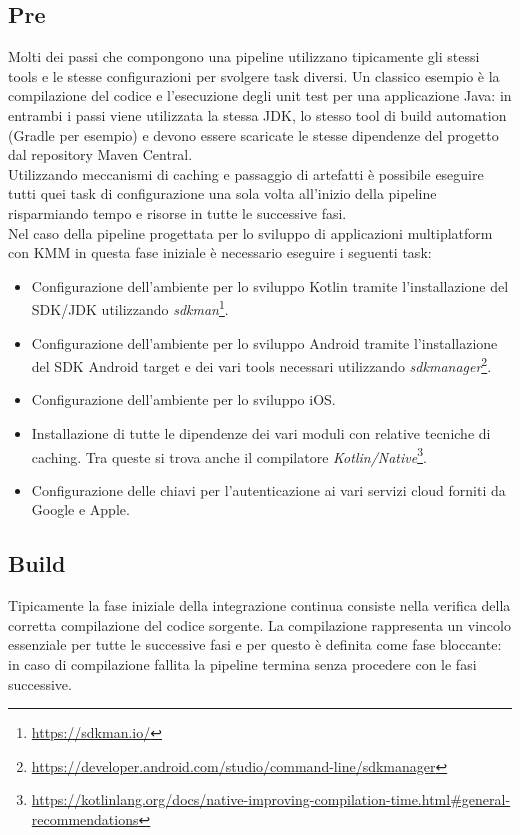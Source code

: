 \subsection{Pre}
Molti dei passi che compongono una pipeline utilizzano tipicamente gli stessi tools e le stesse configurazioni per svolgere task diversi. Un classico esempio è la compilazione del codice e l'esecuzione degli unit test per una applicazione Java: in entrambi i passi viene utilizzata la stessa JDK, lo stesso tool di build automation (Gradle per esempio) e devono essere scaricate le stesse dipendenze del progetto dal repository Maven Central.\\
Utilizzando meccanismi di caching e passaggio di artefatti è possibile eseguire tutti quei task di configurazione una sola volta all'inizio della pipeline risparmiando tempo e risorse in tutte le successive fasi.\\
Nel caso della pipeline progettata per lo sviluppo di applicazioni multiplatform con KMM in questa fase iniziale è necessario eseguire i seguenti task:
\begin{itemize}
    \item Configurazione dell'ambiente per lo sviluppo Kotlin tramite l'installazione del SDK/JDK utilizzando \textit{sdkman}\footnote{\url{https://sdkman.io/}}.
    \item Configurazione dell'ambiente per lo sviluppo Android tramite l'installazione del SDK Android target e dei vari tools necessari utilizzando \textit{sdkmanager}\footnote{\url{https://developer.android.com/studio/command-line/sdkmanager}}.
    \item Configurazione dell'ambiente per lo sviluppo iOS.
    \item Installazione di tutte le dipendenze dei vari moduli con relative tecniche di caching. Tra queste si trova anche il compilatore \textit{Kotlin/Native}\footnote{\url{https://kotlinlang.org/docs/native-improving-compilation-time.html\#general-recommendations}}.
    \item Configurazione delle chiavi per l'autenticazione ai vari servizi cloud forniti da Google e Apple.
\end{itemize}

\subsection{Build}
Tipicamente la fase iniziale della integrazione continua consiste nella verifica della corretta compilazione del codice sorgente. La compilazione rappresenta un vincolo essenziale per tutte le successive fasi e per questo è definita come fase bloccante: in caso di compilazione fallita la pipeline termina senza procedere con le fasi successive.

